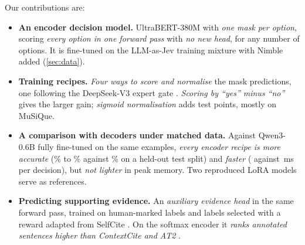 Our contributions are:
\begin{itemize}\setlength{\itemsep}{2pt}\setlength{\topsep}{2pt}
  \item \textbf{An encoder decision model.}
    UltraBERT-380M with \emph{one mask per option}, scoring \emph{every option in one forward pass} with \emph{no new head}, for any number of options.
    It is fine-tuned on the LLM-as-Jev training mixture with Nimble added (\cref{sec:data}).
  \item \textbf{Training recipes.}
    \emph{Four ways to score and normalise} the mask predictions, one following the DeepSeek-V3 expert gate \citep{deepseekv3}.
    \emph{Scoring by ``yes'' minus ``no''} gives the larger gain; \emph{sigmoid normalisation} adds \DiffUbSigUbYesNoAbs{} test points, mostly on MuSiQue.
  \item \textbf{A comparison with decoders under matched data.}
    Against Qwen3-0.6B \citep{qwen3} fully fine-tuned on the same examples, \emph{every encoder recipe is more accurate} (\TestUbList{}\% to \TestUbSig{}\% against \TestQwFull{}\% on a held-out test split) and \emph{faster} (\MsUb{} against \MsQwFull{}\,ms per decision), but \emph{not lighter} in peak memory.
    Two reproduced LoRA models \citep{lora} serve as references.
  \item \textbf{Predicting supporting evidence.}
    An \emph{auxiliary evidence head} in the same forward pass, trained on human-marked labels and labels selected with a reward adapted from SelfCite \citep{selfcite}.
    On the softmax encoder it \emph{ranks annotated sentences higher than ContextCite and AT2} \citep{contextcite, at2}.
\end{itemize}
